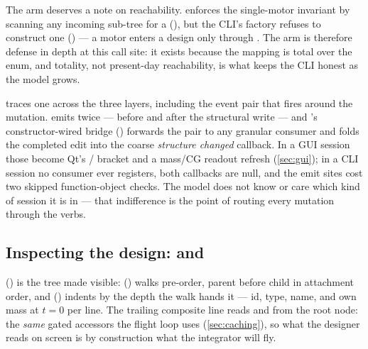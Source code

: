 The  arm deserves a note on reachability.  enforces the
single-motor invariant by scanning any incoming sub-tree for a 
(), but the CLI's factory refuses to construct one
() --- a motor enters a design only through
. The arm is therefore defense in depth at this call site: it exists because the
mapping is total over the enum, and totality, not present-day reachability, is what keeps the CLI
honest as the model grows.

 traces one  across the three layers, including the event pair
that fires around the mutation.  emits 
twice --- before and after the structural write --- and 's constructor-wired
bridge () forwards the pair to any granular consumer and folds
the completed edit into the coarse \emph{structure changed} callback. In a GUI session those become
Qt's / bracket and a mass/CG readout refresh
(\cref{sec:gui}); in a CLI session no consumer ever registers, both callbacks are null, and the
emit sites cost two skipped function-object checks. The model does not know or care which kind of
session it is in --- that indifference is the point of routing every mutation through the verbs.


\subsection[Inspecting the design: listparts and checkdesign]{Inspecting the design:  and }\label{sec:cli-inspect}

 () is the tree made visible: 
() walks pre-order, parent before child in attachment order, and
 () indents by the depth the walk hands it --- id, type,
name, and own mass at $t=0$ per line. The trailing composite line reads
 and  from the root node: the \emph{same}
gated accessors the flight loop uses (\cref{sec:caching}), so what the designer reads on screen is
by construction what the integrator will fly.

